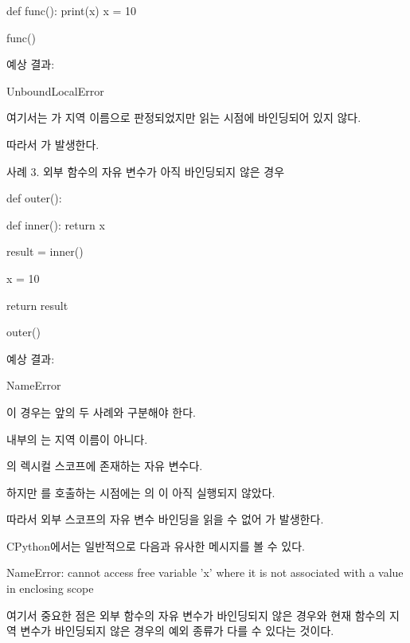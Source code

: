 \begin{dhkcode}
def func():
    print(x)
    x = 10

func()
\end{dhkcode}

예상 결과:

\begin{dhkzsh}
UnboundLocalError
\end{dhkzsh}

여기서는 가 지역 이름으로 판정되었지만 읽는 시점에 바인딩되어 있지 않다.

따라서 가 발생한다.

\begin{dhknote}
\begin{dhksmry}[centered]
사례 3. 외부 함수의 자유 변수가 아직 바인딩되지 않은 경우
\end{dhksmry}
\end{dhknote}

\begin{dhkcode}
def outer():

    def inner():
        return x

    result = inner()

    x = 10

    return result


outer()
\end{dhkcode}

예상 결과:

\begin{dhkzsh}
NameError
\end{dhkzsh}

이 경우는 앞의 두 사례와 구분해야 한다.

 내부의 는 지역 이름이 아니다.

의 렉시컬 스코프에 존재하는 자유 변수다.

하지만 를 호출하는 시점에는 의 이 아직 실행되지 않았다.

따라서 외부 스코프의 자유 변수 바인딩을 읽을 수 없어 가 발생한다.

CPython에서는 일반적으로 다음과 유사한 메시지를 볼 수 있다.

\begin{dhkzsh}
NameError: cannot access free variable 'x' 
where it is not associated with a value in enclosing scope
\end{dhkzsh}

여기서 중요한 점은 외부 함수의 자유 변수가 바인딩되지 않은 경우와 현재 함수의 지역 변수가 바인딩되지 않은 경우의 예외 종류가 다를 수 있다는 것이다.


